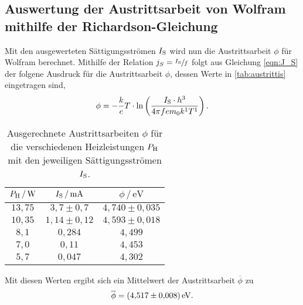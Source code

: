 \subsection{Auswertung der Austrittsarbeit von Wolfram mithilfe der Richardson-Gleichung}
\label{subsec:richard}

Mit den ausgewerteten Sättigungsströmen $I_{\text S}$ wird nun die Austrittsarbeit $\phi$ für Wolfram berechnet. Mithilfe der Relation
$j_S= \sfrac{I_{\text S}}{f}$ folgt aus Gleichung \eqref{eqn:J_S} der folgene Ausdruck für die Austrittsarbeit $\phi$, dessen Werte in \autoref{tab:austrittis} eingetragen sind,
\begin{align*}
  \phi = -\frac ke T\cdot\ln\left(\frac{I_{\text S}\cdot h^3}{4\pi fem_0k^1T^1}\right).
\end{align*}

\begin{table}[H]
  \caption{Ausgerechnete Austrittsarbeiten $\phi$ für die verschiedenen Heizleistungen $P_{\text H}$ mit den jeweiligen Sättigungsströmen $I_{\text S}$.}
  \label{tab:austrittis}
  \centering
  \begin{tabular}{c c c}
      \toprule
      $P_{\text H} \,/\, \si{\watt}$ & $I_{\text S} \,/\, \si{\milli\ampere}$ & $\phi \,/\, \si{\eV}$\\
      \midrule
      $13,75$ & $3,7 \pm 0,7$   & $4,740 \pm 0,035$ \\
      $10,35$ & $1,14 \pm 0,12$ & $4,593 \pm 0,018$ \\
      $8,1$   & $0,284$         & $4,499$ \\
      $7,0$   & $0,11$          & $4,453$ \\
      $5,7$   & $0,047$         & $4,302$ \\
      \bottomrule
    \end{tabular}
\end{table}

\noindent
Mit diesen Werten ergibt sich ein Mittelwert der Austrittsarbeit $\overline \phi$ zu
\begin{align*}
  \overline \phi = \SI{4,517 \pm 0,008}{\eV}.
\end{align*}